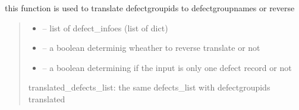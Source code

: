 \documentclass[letterpaper,10pt,english]{sphinxmanual}
\begin{document}
\begin{savenotes}\begin{fulllineitems}
\label{\detokenize{setting/backend/defect_management_funcs:oxin.backend.defect_management_funcs.change_defect_group_id_to_name}}
\pysigstartsignatures
{}
\pysigstopsignatures
\sphinxAtStartPar
this function is used to translate defect\sphinxhyphen{}group\sphinxhyphen{}ids to defect\sphinxhyphen{}group\sphinxhyphen{}names or reverse
\begin{quote}\begin{description}
\begin{itemize}
\item {} 
\sphinxAtStartPar
{} – list of defect\_infoes (list of dict)

\item {} 
\sphinxAtStartPar
{} – a boolean determinig wheather to reverse translate or not

\item {} 
\sphinxAtStartPar
{} – a boolean determining if the input is only one defect record or not

\end{itemize}

\sphinxAtStartPar
translated\_defects\_list: the same defects\_list with defect\sphinxhyphen{}group\sphinxhyphen{}ids translated

\end{description}\end{quote}

\end{fulllineitems}\end{savenotes}

\end{document}
